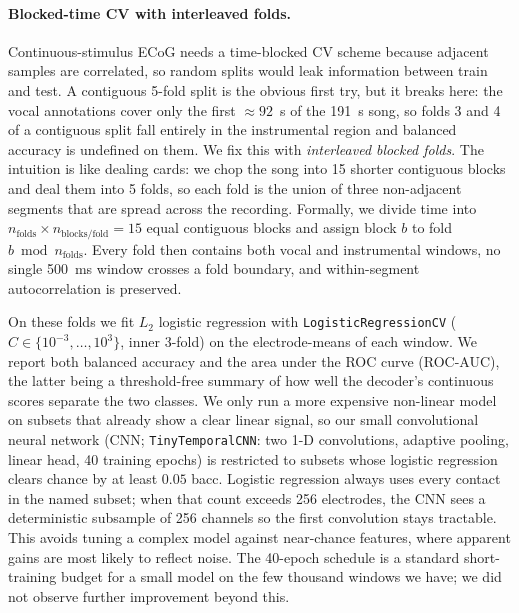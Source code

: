 \documentclass[11pt]{article}
\begin{document}
\paragraph{Blocked-time CV with interleaved folds.} Continuous-stimulus ECoG needs a time-blocked CV scheme because adjacent samples are correlated, so random splits would leak information between train and test. A contiguous 5-fold split is the obvious first try, but it breaks here: the vocal annotations cover only the first $\approx 92$~s of the 191~s song, so folds 3 and 4 of a contiguous split fall entirely in the instrumental region and balanced accuracy is undefined on them. We fix this with \emph{interleaved blocked folds}. The intuition is like dealing cards: we chop the song into 15 shorter contiguous blocks and deal them into 5 folds, so each fold is the union of three non-adjacent segments that are spread across the recording. Formally, we divide time into $n_\text{folds} \times n_\text{blocks/fold} = 15$ equal contiguous blocks and assign block $b$ to fold $b \bmod n_\text{folds}$. Every fold then contains both vocal and instrumental windows, no single 500~ms window crosses a fold boundary, and within-segment autocorrelation is preserved.

On these folds we fit $L_2$ logistic regression with \texttt{LogisticRegressionCV} ($C \in \{10^{-3}, \dots, 10^{3}\}$, inner 3-fold) on the electrode-means of each window. We report both balanced accuracy and the area under the ROC curve (ROC-AUC), the latter being a threshold-free summary of how well the decoder's continuous scores separate the two classes. We only run a more expensive non-linear model on subsets that already show a clear linear signal, so our small convolutional neural network (CNN; \texttt{TinyTemporalCNN}: two 1-D convolutions, adaptive pooling, linear head, 40 training epochs) is restricted to subsets whose logistic regression clears chance by at least $0.05$ bacc. Logistic regression always uses every contact in the named subset; when that count exceeds 256 electrodes, the CNN sees a deterministic subsample of 256 channels so the first convolution stays tractable. This avoids tuning a complex model against near-chance features, where apparent gains are most likely to reflect noise. The 40-epoch schedule is a standard short-training budget for a small model on the few thousand windows we have; we did not observe further improvement beyond this.
\end{document}
